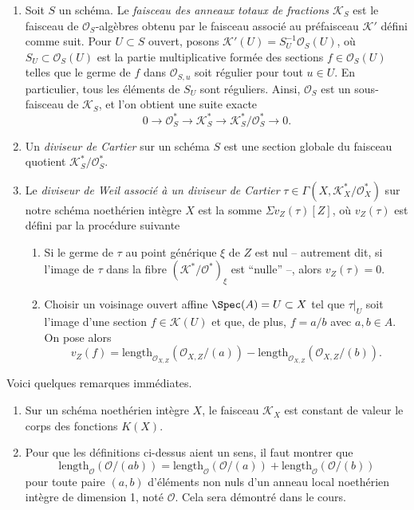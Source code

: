 \begin{definition}
\begin{enumerate}
\begin{enumerate}
$$$$
où $f \in {\mathcal O}_{X, Z} = {\mathcal O}_{X, \xi}$ est l'élément régulier
qui définit $D$ dans un voisinage affine de $\xi$ (comme en (4) ci-dessus).
\end{enumerate}
\item Soit $S$ un schéma. Le {\it faisceau des anneaux totaux de
fractions ${\mathcal K}_S$} est le faisceau de ${\mathcal O}_S$-algèbres obtenu par
le faisceau associé au préfaisceau ${\mathcal K}'$ défini comme suit.
Pour $U \subset S$ ouvert, posons ${\mathcal K}'(U) = S_U^{-1}{\mathcal O}_S(U)$,
où $S_U \subset {\mathcal O}_S(U)$ est la partie multiplicative
formée des sections $f \in {\mathcal O}_S(U)$ telles que le germe
de $f$ dans ${\mathcal O}_{S, u}$ soit régulier pour tout $u\in U$.
En particulier, tous les éléments de $S_U$ sont réguliers.
Ainsi, ${\mathcal O}_S$ est un sous-faisceau de ${\mathcal K}_S$, et l'on obtient une
suite exacte
$$
0 \to {\mathcal O}_S^\ast \to {\mathcal K}_S^\ast \to
{\mathcal K}_S^\ast/{\mathcal O}_S^\ast \to 0.
$$
\item Un {\it diviseur de Cartier} sur un schéma $S$ est une section globale
du faisceau quotient ${\mathcal K}_S^\ast/{\mathcal O}_S^\ast$.
\item Le {\it diviseur de Weil associé à un diviseur de Cartier}
$\tau \in \Gamma(X, {\mathcal K}_X^\ast/{\mathcal O}_X^\ast)$ sur notre schéma
noethérien intègre
$X$ est la somme $\Sigma v_Z(\tau)[Z]$, où $v_Z(\tau)$ est défini
par la procédure suivante
\begin{enumerate}
\item Si le germe de $\tau$ au point générique $\xi$
de $Z$ est nul -- autrement dit, si l'image de $\tau$ dans la fibre
$({\mathcal K}^\ast/{\mathcal O}^\ast)_\xi$ est ``nulle'' --, alors $v_Z(\tau) = 0$.
\item Choisir un voisinage ouvert affine $\Spec(A) = U \subset X$
tel que $\tau|_U$ soit l'image d'une section $f \in {\mathcal K}(U)$
et que, de plus, $f = a/b$ avec $a, b \in A$. On pose alors
$$
v_Z(f) = \text{length}_{{\mathcal O}_{X, Z}}({\mathcal O}_{X, Z}/(a)) -
\text{length}_{{\mathcal O}_{X, Z}}({\mathcal O}_{X, Z}/(b)).
$$
\end{enumerate}
\end{enumerate}
\end{definition}

\begin{remarks}
\label{remarks-divisors}
Voici quelques remarques immédiates.
\begin{enumerate}
\item Sur un schéma noethérien intègre $X$, le
faisceau ${\mathcal K}_X$ est constant de valeur le corps des fonctions $K(X)$.
\item Pour que les définitions ci-dessus aient un sens, il faut
montrer que
$$
\text{length}_{\mathcal O}({\mathcal O}/(ab)) =
\text{length}_{\mathcal O}({\mathcal O}/(a)) +
\text{length}_{\mathcal O}({\mathcal O}/(b))
$$
pour toute paire $(a, b)$ d'éléments non nuls d'un anneau local noethérien intègre
de dimension 1, noté ${\mathcal O}$. Cela sera démontré dans le cours.
\end{enumerate}
\end{remarks}

